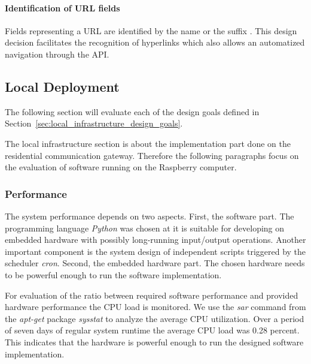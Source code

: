 \paragraph{Identification of URL fields}

Fields representing a URL are identified by the name  or the suffix .
This design decision facilitates the recognition of hyperlinks which also allows an automatized navigation through the API.



\subsection{Local Deployment}



The following section will evaluate each of the design goals defined in Section~\ref{sec:local_infrastructure_design_goals}.

The local infrastructure section is about the implementation part done on the residential communication gateway.
Therefore the following paragraphs focus on the evaluation of software running on the Raspberry computer.

\subsubsection{Performance}

The system performance depends on two aspects.
First, the software part.
The programming language \emph{Python} was chosen at it is suitable for developing on embedded hardware with possibly long-running input/output operations.
Another important component is the system design of independent scripts triggered by the scheduler \emph{cron}.
Second, the embedded hardware part.
The chosen hardware needs to be powerful enough to run the software implementation.

For evaluation of the ratio between required software performance and provided hardware performance the CPU load is monitored.
We use the \emph{sar} command from the \emph{apt-get} package \emph{sysstat} to analyze the average CPU utilization.
Over a period of seven days of regular system runtime the average CPU load was 0.28 percent.
This indicates that the hardware is powerful enough to run the designed software implementation.


